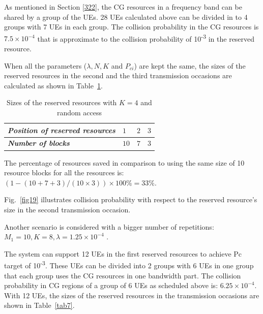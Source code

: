 \documentclass{report}
\begin{document}
As mentioned in Section \ref{322}, the CG resources in a frequency band can be shared by a group of the UEs. 28 UEs calculated above can be divided in to 4 groups with 7 UEs in each group. The collision probability in the CG resources is $7.5\times10^{-4}$ that is approximate to the collision probability of 10\textsuperscript{-3} in the reserved resource.

When all the parameters ($\lambda, N, K$ and $P_{ci}$) are kept the same, the sizes of the reserved resources in the second and the third transmission occasions are calculated as shown in Table~\ref{tab6}.
\begin{table}[htbp]
\caption{Sizes of the reserved resources with $K=4$ and random access}
\begin{center}
\begin{tabular}{|p{10em}|p{2em}|p{2em}|p{2em}|}
 \hline
 \textbf{\textit{Position of reserved resources}} & $1$ &$2$ &$3$ \\ 
 \hline
 \textbf{\textit{Number of blocks}} & $10$ &$7$ &$3$ \\

 
 \hline
\end{tabular}
\label{tab6}
\end{center}
\end{table}


The percentage of resources saved in comparison to using the same size of 10 resource blocks for all the resources is: $(1 - (10+7+3)/(10\times3))\times100\% = 33\%$.

Fig.~\ref{fig19} illustrates collision probability with respect to the reserved resource's size in the second transmission occasion.

Another scenario is considered with a bigger number of repetitions: $M_1=10, K=8, \lambda=1.25\times10^{-4}$ .

The system can support 12 UEs in the first reserved resources to achieve Pc target of 10\textsuperscript{-3}. These UEs can be divided into 2 groups with 6 UEs in one group that each group uses the CG resources in one bandwidth part. The collision probability in CG regions of a group of 6 UEs as scheduled above is: $6.25\times10^{-4}$.
With 12 UEs, the sizes of the reserved resources in the transmission occasions are shown in Table~\ref{tab7}.
\end{document}
